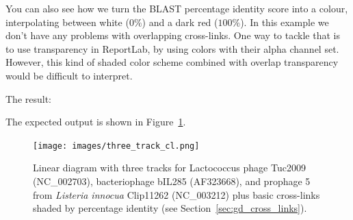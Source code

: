 \documentclass{report}
\begin{document}
You can also see how we turn the BLAST percentage identity score into a colour,
interpolating between white ($0\%$) and a dark red ($100\%$). In this example
we don't have any problems with overlapping cross-links. One way to tackle that
is to use transparency in ReportLab, by using colors with their alpha channel set.
However, this kind of shaded color scheme combined with overlap transparency
would be difficult to interpret.
\begin{htmlonly}
\noindent The result:


\end{htmlonly}
\begin{latexonly}
\noindent The expected output is shown in Figure~\ref{fig:three_track_cl}.
\begin{figure}[htbp]
\centering
\texttt{[image: images/three\_track\_cl.png]}
\caption{Linear diagram with three tracks for Lactococcus phage Tuc2009
(NC\_002703), bacteriophage bIL285 (AF323668), and prophage 5 from
\textit{Listeria innocua} Clip11262 (NC\_003212) plus basic cross-links
shaded by percentage identity (see Section~\ref{sec:gd_cross_links}).}
\label{fig:three_track_cl}
\end{figure}
\end{latexonly}
\end{document}
